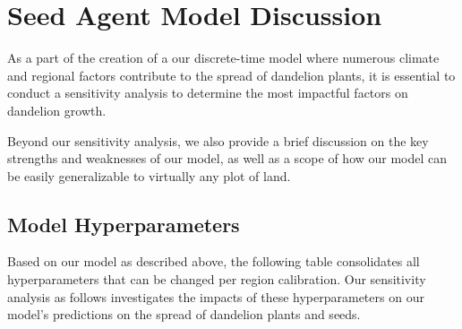\section{Seed Agent Model Discussion}

As a part of the creation of a our discrete-time model where numerous climate and regional factors contribute to the spread of dandelion plants, it is essential to conduct a sensitivity analysis to determine the most impactful factors on dandelion growth.

Beyond our sensitivity analysis, we also provide a brief discussion on the key strengths and weaknesses of our model, as well as a scope of how our model can be easily generalizable to virtually any plot of land.

\subsection{Model Hyperparameters}

Based on our model as described above, the following table consolidates all hyperparameters that can be changed per region calibration. Our sensitivity analysis as follows investigates the impacts of these hyperparameters on our model's predictions on the spread of dandelion plants and seeds.

